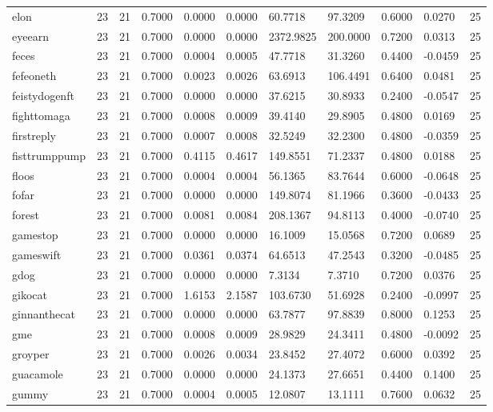 \begin{table}[htbp]
\begin{tabular}{lllllllllll}
elon & 23 & 21 & 0.7000 & 0.0000 & 0.0000 & 60.7718 & 97.3209 & 0.6000 & 0.0270 & 25 \\
eyeearn & 23 & 21 & 0.7000 & 0.0000 & 0.0000 & 2372.9825 & 200.0000 & 0.7200 & 0.0313 & 25 \\
feces & 23 & 21 & 0.7000 & 0.0004 & 0.0005 & 47.7718 & 31.3260 & 0.4400 & -0.0459 & 25 \\
fefeoneth & 23 & 21 & 0.7000 & 0.0023 & 0.0026 & 63.6913 & 106.4491 & 0.6400 & 0.0481 & 25 \\
feistydogenft & 23 & 21 & 0.7000 & 0.0000 & 0.0000 & 37.6215 & 30.8933 & 0.2400 & -0.0547 & 25 \\
fighttomaga & 23 & 21 & 0.7000 & 0.0008 & 0.0009 & 39.4140 & 29.8905 & 0.4800 & 0.0169 & 25 \\
firstreply & 23 & 21 & 0.7000 & 0.0007 & 0.0008 & 32.5249 & 32.2300 & 0.4800 & -0.0359 & 25 \\
fisttrumppump & 23 & 21 & 0.7000 & 0.4115 & 0.4617 & 149.8551 & 71.2337 & 0.4800 & 0.0188 & 25 \\
floos & 23 & 21 & 0.7000 & 0.0004 & 0.0004 & 56.1365 & 83.7644 & 0.6000 & -0.0648 & 25 \\
fofar & 23 & 21 & 0.7000 & 0.0000 & 0.0000 & 149.8074 & 81.1966 & 0.3600 & -0.0433 & 25 \\
forest & 23 & 21 & 0.7000 & 0.0081 & 0.0084 & 208.1367 & 94.8113 & 0.4000 & -0.0740 & 25 \\
gamestop & 23 & 21 & 0.7000 & 0.0000 & 0.0000 & 16.1009 & 15.0568 & 0.7200 & 0.0689 & 25 \\
gameswift & 23 & 21 & 0.7000 & 0.0361 & 0.0374 & 64.6513 & 47.2543 & 0.3200 & -0.0485 & 25 \\
gdog & 23 & 21 & 0.7000 & 0.0000 & 0.0000 & 7.3134 & 7.3710 & 0.7200 & 0.0376 & 25 \\
gikocat & 23 & 21 & 0.7000 & 1.6153 & 2.1587 & 103.6730 & 51.6928 & 0.2400 & -0.0997 & 25 \\
ginnanthecat & 23 & 21 & 0.7000 & 0.0000 & 0.0000 & 63.7877 & 97.8839 & 0.8000 & 0.1253 & 25 \\
gme & 23 & 21 & 0.7000 & 0.0008 & 0.0009 & 28.9829 & 24.3411 & 0.4800 & -0.0092 & 25 \\
groyper & 23 & 21 & 0.7000 & 0.0026 & 0.0034 & 23.8452 & 27.4072 & 0.6000 & 0.0392 & 25 \\
guacamole & 23 & 21 & 0.7000 & 0.0000 & 0.0000 & 24.1373 & 27.6651 & 0.4400 & 0.1400 & 25 \\
gummy & 23 & 21 & 0.7000 & 0.0004 & 0.0005 & 12.0807 & 13.1111 & 0.7600 & 0.0632 & 25 \\

\end{tabular}
\end{table}
